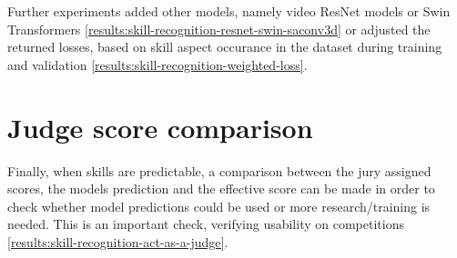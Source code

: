 Further experiments added other models, namely video ResNet models or Swin Transformers \ref{results:skill-recognition-resnet-swin-saconv3d} or adjusted the returned losses, based on skill aspect occurance in the dataset during training and validation \ref{results:skill-recognition-weighted-loss}. 

\section{Judge score comparison}
\label{methodology:judge-score-comparison}

Finally, when skills are predictable, a comparison between the jury assigned scores, the models prediction and the effective score can be made in order to check whether model predictions could be used or more research/training is needed. This is an important check, verifying usability on competitions \ref{results:skill-recognition-act-as-a-judge}.

